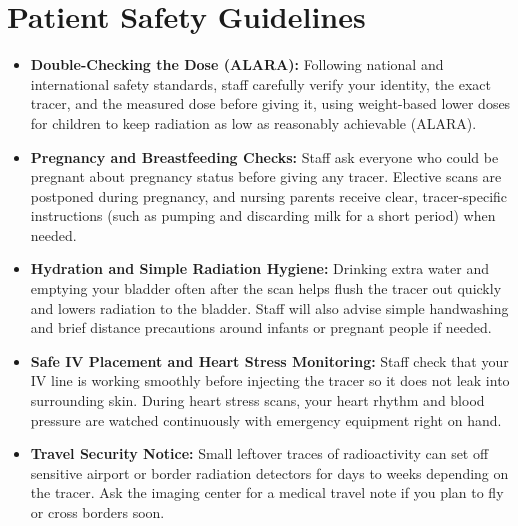 \section{Patient Safety Guidelines}
\begin{itemize}
\item \textbf{Double-Checking the Dose (ALARA):} Following national and international safety standards, staff carefully verify your identity, the exact tracer, and the measured dose before giving it, using weight-based lower doses for children to keep radiation as low as reasonably achievable (ALARA).
\item \textbf{Pregnancy and Breastfeeding Checks:} Staff ask everyone who could be pregnant about pregnancy status before giving any tracer. Elective scans are postponed during pregnancy, and nursing parents receive clear, tracer-specific instructions (such as pumping and discarding milk for a short period) when needed.
\item \textbf{Hydration and Simple Radiation Hygiene:} Drinking extra water and emptying your bladder often after the scan helps flush the tracer out quickly and lowers radiation to the bladder. Staff will also advise simple handwashing and brief distance precautions around infants or pregnant people if needed.
\item \textbf{Safe IV Placement and Heart Stress Monitoring:} Staff check that your IV line is working smoothly before injecting the tracer so it does not leak into surrounding skin. During heart stress scans, your heart rhythm and blood pressure are watched continuously with emergency equipment right on hand.
\item \textbf{Travel Security Notice:} Small leftover traces of radioactivity can set off sensitive airport or border radiation detectors for days to weeks depending on the tracer. Ask the imaging center for a medical travel note if you plan to fly or cross borders soon.
\end{itemize}

